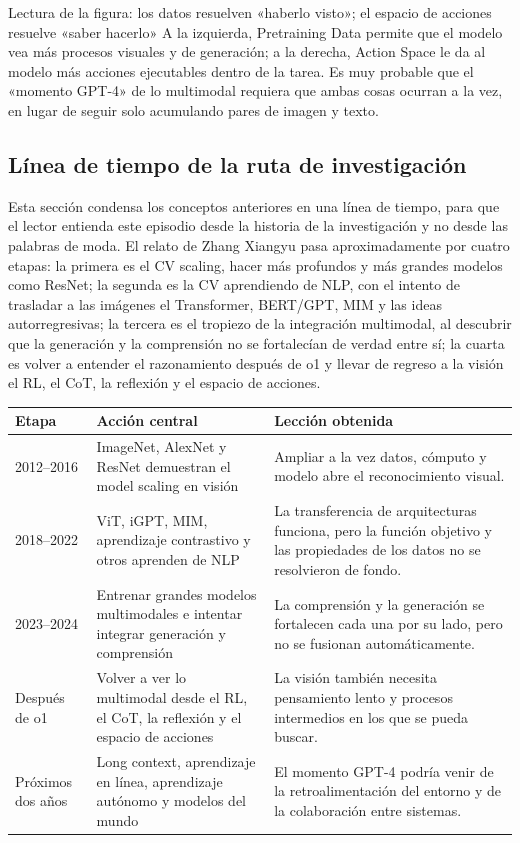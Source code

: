 \documentclass[a4paper]{article}
\begin{document}
\begin{knowledgebox}{Lectura de la figura: los datos resuelven «haberlo visto»; el espacio de acciones resuelve «saber hacerlo»}
A la izquierda, Pretraining Data permite que el modelo vea más procesos visuales y de generación; a la derecha, Action Space le da al modelo más acciones ejecutables dentro de la tarea. Es muy probable que el «momento GPT-4» de lo multimodal requiera que ambas cosas ocurran a la vez, en lugar de seguir solo acumulando pares de imagen y texto.
\end{knowledgebox}

\subsection{Línea de tiempo de la ruta de investigación}

Esta sección condensa los conceptos anteriores en una línea de tiempo, para que el lector entienda este episodio desde la historia de la investigación y no desde las palabras de moda. El relato de Zhang Xiangyu pasa aproximadamente por cuatro etapas: la primera es el CV scaling, hacer más profundos y más grandes modelos como ResNet; la segunda es la CV aprendiendo de NLP, con el intento de trasladar a las imágenes el Transformer, BERT/GPT, MIM y las ideas autorregresivas; la tercera es el tropiezo de la integración multimodal, al descubrir que la generación y la comprensión no se fortalecían de verdad entre sí; la cuarta es volver a entender el razonamiento después de o1 y llevar de regreso a la visión el RL, el CoT, la reflexión y el espacio de acciones.

\noindent\begin{tabularx}{\textwidth}{p{}p{}X}
\toprule
Etapa & Acción central & Lección obtenida \\
\midrule
2012--2016 & ImageNet, AlexNet y ResNet demuestran el model scaling en visión & Ampliar a la vez datos, cómputo y modelo abre el reconocimiento visual. \\
2018--2022 & ViT, iGPT, MIM, aprendizaje contrastivo y otros aprenden de NLP & La transferencia de arquitecturas funciona, pero la función objetivo y las propiedades de los datos no se resolvieron de fondo. \\
2023--2024 & Entrenar grandes modelos multimodales e intentar integrar generación y comprensión & La comprensión y la generación se fortalecen cada una por su lado, pero no se fusionan automáticamente. \\
Después de o1 & Volver a ver lo multimodal desde el RL, el CoT, la reflexión y el espacio de acciones & La visión también necesita pensamiento lento y procesos intermedios en los que se pueda buscar. \\
Próximos dos años & Long context, aprendizaje en línea, aprendizaje autónomo y modelos del mundo & El momento GPT-4 podría venir de la retroalimentación del entorno y de la colaboración entre sistemas. \\
\bottomrule
\end{tabularx}
\end{document}
